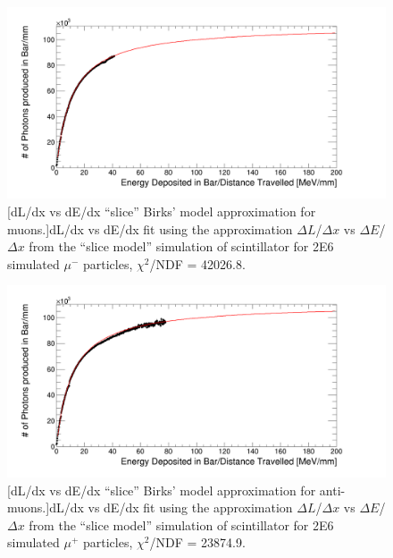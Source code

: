 \begin{figure}[htbp]
 \centering
 \includegraphics[width=\linewidth]{Appendix4/Figs/newNewDldxVsDeDx/muonDeDxDlDx.png}
 [dL/dx vs dE/dx ``slice'' Birks' model approximation for muons.]{dL/dx vs dE/dx fit using the approximation $\Delta L$/$\Delta x$ vs $\Delta E$/$\Delta x$ from the ``slice model'' simulation of scintillator for 2E6 simulated $\mu^-$ particles, $\chi^2$/NDF = 42026.8.} 
 \label{fig:slice_Muon_dl_dx}
\end{figure}

\begin{figure}[htbp]
 \centering
 \includegraphics[width=\linewidth]{Appendix4/Figs/newNewDldxVsDeDx/antiMuonDeDxDlDx.png}
 [dL/dx vs dE/dx ``slice'' Birks' model approximation for anti-muons.]{dL/dx vs dE/dx fit using the approximation $\Delta L$/$\Delta x$ vs $\Delta E$/$\Delta x$ from the ``slice model'' simulation of scintillator for 2E6 simulated $\mu^+$ particles, $\chi^2$/NDF = 23874.9.} 
 \label{fig:slice_AMuon_dl_dx}
\end{figure}


